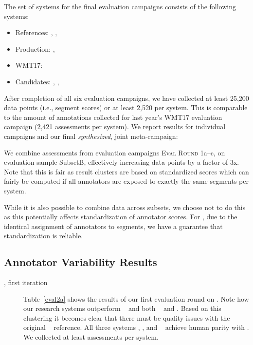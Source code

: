 \documentclass[a4paper]{article}
\begin{document}
\begin{CJK*}{UTF8}{gbsn}
The set of systems for the final evaluation campaigns consists of the following systems:
\begin{itemize}[noitemsep]
\item References: \RefHT, \RefPE, \RefWMT
\item Production: \Microsoft, \Google
\item WMT17: \Sogou
\item Candidates: \ComboA, \ComboB, \ComboC
\end{itemize}

After completion of all six evaluation campaigns, we have collected at least 25,200 data points (i.e., segment scores) or at least 2,520 per system. This is comparable to the amount of annotations collected for last year's WMT17 evaluation campaign (2,421 assessments per system). We report results for individual campaigns and our final \emph{synthesized}, joint meta-campaign:

\begin{description}[noitemsep]
\item[\MetaA] We combine assessments from evaluation campaigns \textsc{Eval Round 1}a--c, on evaluation sample SubsetB, effectively increasing data points by a factor of 3x. Note that this is fair as result clusters are based on standardized scores which can fairly be computed if all annotators are exposed to exactly the same segments per system.



\end{description}

While it is also possible to combine data across subsets, we choose not to do this as this potentially affects standardization of annotator scores. For \MetaA, due to the identical assignment of annotators to segments, we have a guarantee that standardization is reliable.





\subsection{Annotator Variability Results}
\begin{description}
\item[\SubsetB, first iteration] Table~\ref{eval2a} shows the results of our first evaluation round on \SubsetB. Note how our research systems outperform \Sogou~ and both \RefWMT~ and \RefPE. Based on this clustering it becomes clear that there must be quality issues with the original \RefWMT~ reference. All three systems \ComboA, \ComboB, and \ComboC~ achieve human parity with \RefHT. We collected at least  assessments per system.


\end{description}
\end{CJK*}
\end{document}

